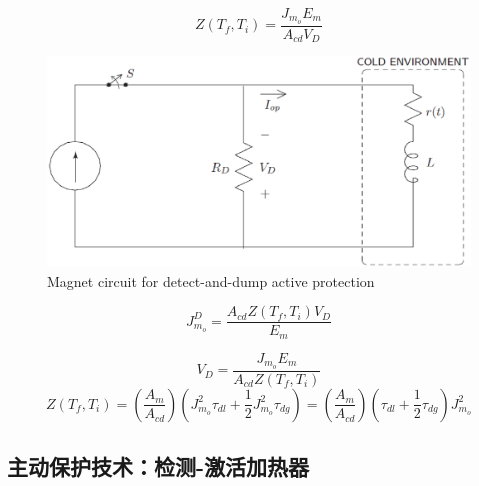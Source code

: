 \begin{equation}%
Z(T_f,T_i)=\frac{J_{m_o}E_m}{A_{cd}V_D}
\end{equation}

\begin{figure}
	\centering
	\includegraphics[scale=0.6]{chpt8/figs/fig8.17.eps}
	\caption{Magnet circuit for detect-and-dump active protection}
\end{figure}



\begin{equation}%
J_{m_o}^{D}=\frac{A_{cd}Z(T_f,T_i)V_D}{E_m}
\end{equation}



\begin{equation}%
V_D=\frac{J_{m_o}E_m}{A_{cd}Z(T_f,T_i)}
\end{equation}
\begin{equation}%
Z(T_f,T_i)=\left(\frac{A_m}{A_{cd}}\right)(J_{m_o}^{2}\tau_{dl}+\frac{1}{2}J_{m_o}^{2}\tau_{dg})
=\left(\frac{A_m}{A_{cd}}\right)(\tau_{dl}+\frac{1}{2}\tau_{dg})J_{m_o}^{2}
\end{equation}






\subsection{主动保护技术：检测-激活加热器}

